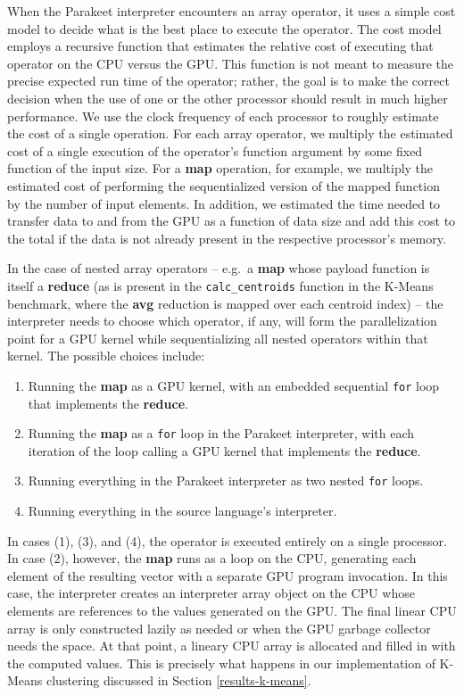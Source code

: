 \documentclass[preprint]{sigplanconf}
\begin{document}
When the Parakeet interpreter encounters an array operator, it uses a simple cost model to decide what is the best place to execute the operator.  The cost model employs a recursive function that estimates the relative cost of executing that operator on the CPU versus the GPU.  This function is not meant to measure the precise expected run time of the operator; rather, the goal is to make the correct decision when the use of one or the other processor should result in much higher performance.  We use the clock frequency of each processor to roughly estimate the cost of a single operation.  For each array operator, we multiply the estimated cost of a single execution of the operator's function argument by some fixed function of the input size.  For a \textbf{map} operation, for example, we multiply the estimated cost of performing the sequentialized version of the mapped function by the number of input elements. In addition, we estimated the time needed to transfer data to and from the GPU as a function of data size and add this cost to the total if the data is not already present in the respective processor's memory.

In the case of nested array operators -- e.g.~a \textbf{map} whose payload function is itself a \textbf{reduce} (as is present in the \texttt{calc\_centroids} function in the K-Means benchmark, where the \textbf{avg} reduction is mapped over each centroid index) -- the interpreter needs to choose which operator, if any, will form the parallelization point for a GPU kernel while sequentializing all nested operators within that kernel.  The possible choices include:

\begin{enumerate}
\item Running the \textbf{map} as a GPU kernel, with an embedded sequential \texttt{for} loop that implements the \textbf{reduce}.
\item Running the \textbf{map} as a \texttt{for} loop in the Parakeet interpreter, with each iteration of the loop calling a GPU kernel that implements the \textbf{reduce}.
\item Running everything in the Parakeet interpreter as two nested \texttt{for} loops.
\item Running everything in the source language's interpreter.
\end{enumerate}

In cases (1), (3), and (4), the operator is executed entirely on a single processor.  In case (2), however, the \textbf{map} runs as a loop on the CPU, generating each element of the resulting vector with a separate GPU program invocation.  In this case, the interpreter creates an interpreter array object on the CPU whose elements are references to the values generated on the GPU.  The final linear CPU array is only constructed lazily as needed or when the GPU garbage collector needs the space.  At that point, a lineary CPU array is allocated and filled in with the computed values.  This is precisely what happens in our implementation of K-Means clustering discussed in Section \ref{results-k-means}.
\end{document}
